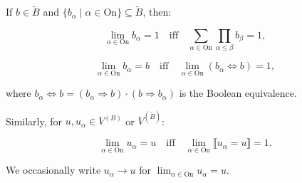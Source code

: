If $b \in \tilde{B}$ and $\{b_{\alpha} \mid \alpha \in \mathrm{On}\} \subseteq \tilde{B}$, then:

$$\lim_{\alpha \in \mathrm{On}} b_{\alpha} = 1 \quad \text{iff} \quad \sum_{\alpha \in \mathrm{On}} \prod_{\alpha \leq \beta} b_{\beta} = 1,$$

$$\lim_{\alpha \in \mathrm{On}} b_{\alpha} = b \quad \text{iff} \quad \lim_{\alpha \in \mathrm{On}} (b_{\alpha} \Leftrightarrow b) = 1,$$

where $b_{\alpha} \Leftrightarrow b = (b_{\alpha} \Rightarrow b) \cdot (b \Rightarrow b_{\alpha})$ is the Boolean equivalence.

Similarly, for $u, u_{\alpha} \in V^{(B)}$ or $V^{(\tilde{B})}$:

$$\lim_{\alpha \in \mathrm{On}} u_{\alpha} = u \quad \text{iff} \quad \lim_{\alpha \in \mathrm{On}} \llbracket u_{\alpha} = u \rrbracket = 1.$$

We occasionally write $u_{\alpha} \rightarrow u$ for $\lim_{\alpha \in \mathrm{On}} u_{\alpha} = u$.
